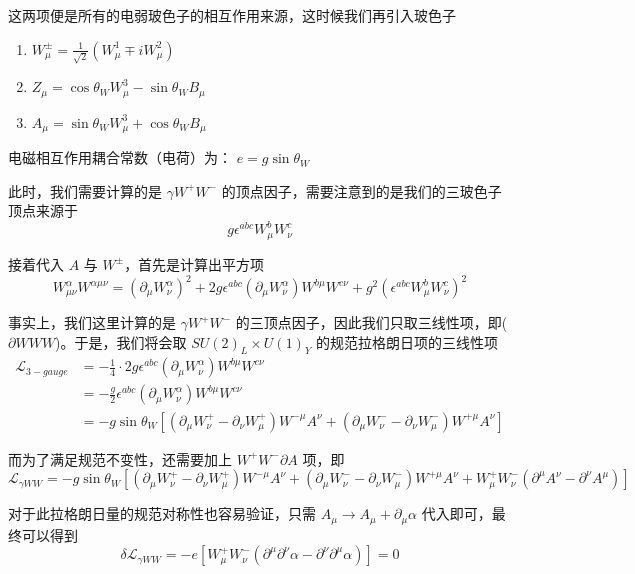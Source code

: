 \documentclass{article}
\begin{document}
这两项便是所有的电弱玻色子的相互作用来源，这时候我们再引入玻色子
\begin{enumerate}
    \item $W_\mu^{\pm} = \frac{1}{\sqrt{2}}(W_\mu^1 \mp i W_\mu^2)$
    \item $Z_\mu = \cos\theta_W W_\mu^3 - \sin\theta_WB_\mu$
    \item $A_\mu = \sin\theta_W W_\mu^3 + \cos\theta_W B_\mu$
\end{enumerate}
电磁相互作用耦合常数（电荷）为： $e = g \sin\theta_W$

此时，我们需要计算的是 $\gamma W^+ W^-$ 的顶点因子，需要注意到的是我们的三玻色子顶点来源于
\begin{equation}
    g\epsilon^{abc}W_\mu^b W_\nu^c
\end{equation}

接着代入 $A$ 与 $W^{\pm}$，首先是计算出平方项
\begin{equation*}
    W_{\mu\nu}^\alpha W^{\alpha\mu\nu} = \left(\partial_\mu W_\nu^\alpha\right)^2 + 2g \epsilon^{abc}\left(\partial_\mu W_\nu^\alpha\right) W^{b\mu}W^{c\nu} + g^2 \left(\epsilon^{abc}W_\mu^b W_\nu^c\right)^2
\end{equation*}

事实上，我们这里计算的是 $\gamma W^+ W^-$ 的三顶点因子，因此我们只取三线性项，即($\partial WWW$)。于是，我们将会取 $SU(2)_L \times U(1)_Y$ 的规范拉格朗日项的三线性项
\begin{align*}
    \mathcal{L}_{3-gauge} &= -\frac{1}{4} \cdot 2g\epsilon^{abc}\left(\partial_\mu W_\nu^\alpha\right) W^{b\mu}W^{c\nu} \\
    &=-\frac{g}{2} \epsilon^{abc} \left(\partial_\mu W_\nu^\alpha\right) W^{b\mu}W^{c\nu} \\
    &= -g \sin \theta_W \left[\left(\partial_\mu W_\nu^+ - \partial_\nu W_\mu^+\right)W^{-\mu}A^\nu + \left(\partial_\mu W_\nu^- - \partial_\nu W_\mu^-\right)W^{+\mu}A^\nu\right] 
\end{align*}

而为了满足规范不变性，还需要加上 $W^+ W^- \partial A$ 项，即
\begin{equation}
    \mathcal{L}_{\gamma WW} = -g \sin \theta_W \left[\left(\partial_\mu W_\nu^+ - \partial_\nu W_\mu^+\right)W^{-\mu}A^\nu + \left(\partial_\mu W_\nu^- - \partial_\nu W_\mu^-\right)W^{+\mu}A^\nu + W_\mu^+ W_\nu^- \left(\partial^\mu A^{\nu} - \partial^\nu A^\mu\right)\right]
\end{equation}

对于此拉格朗日量的规范对称性也容易验证，只需 $A_\mu \to A_\mu + \partial_\mu \alpha$ 代入即可，最终可以得到
\begin{equation*}
    \delta \mathcal{L}_{\gamma WW} = -e\left[W_\mu^+W_\nu^-\left(\partial^\mu\partial^\nu\alpha - \partial^\nu \partial^\mu \alpha\right)\right] = 0
\end{equation*}
\end{document}
